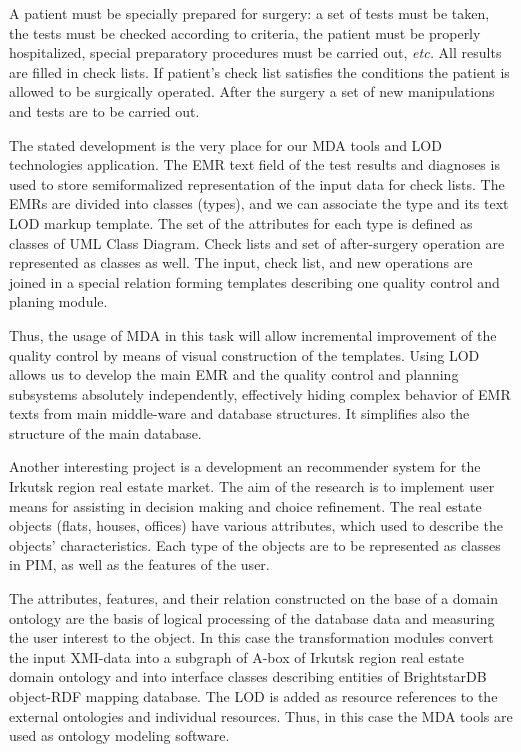\documentclass[conference,a4paper]{IEEEtran}
\begin{document}
A patient must be specially prepared for surgery: a set of tests must be taken, the tests must be checked according to criteria, the patient must be properly hospitalized, special preparatory procedures must be carried out, \emph{etc.}  All results are filled in check lists.   If patient's check list satisfies the conditions the patient is allowed to be surgically operated.  After the surgery a set of new manipulations and tests are to be carried out.

The stated development is the very place for our MDA tools and LOD technologies application.  The EMR text field of the test results and diagnoses is used to store semiformalized representation of the input data for check lists.  The EMRs are divided into classes (types), and we can associate the type and its text LOD markup template.  The set of the attributes for each type is defined as classes of UML Class Diagram.  Check lists and set of after-surgery operation are represented as classes as well.  The input, check list, and new operations are joined in a special relation forming templates describing one quality control and planing module.

Thus, the usage of MDA in this task will allow incremental improvement of the quality control by means of visual construction of the templates.  Using LOD allows us to develop the main EMR and the quality control and planning subsystems absolutely independently, effectively hiding complex behavior of EMR texts from main middle-ware and database structures.  It simplifies also the structure of the main database.

Another interesting project is a development an recommender system for the Irkutsk region real estate market.  The aim of the research is to implement user means for assisting in decision making and choice refinement.  The real estate objects (flats, houses, offices) have various attributes, which used to describe the objects' characteristics.  Each type of the objects are to be represented as classes in PIM, as well as the features of the user.

The attributes, features, and their relation constructed on the base of a domain ontology are the basis of logical processing of the database data and measuring the user interest to the object.  In this case the transformation modules convert the input XMI-data into a subgraph of A-box of Irkutsk region real estate domain ontology and into interface classes describing entities of BrightstarDB object-RDF mapping database.  The LOD is added as resource references to the external ontologies and individual resources.  Thus, in this case the MDA tools are used as ontology modeling software.
\end{document}
